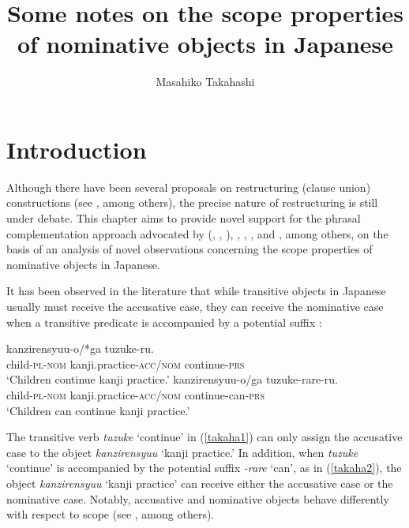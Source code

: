 \documentclass[output=paper]{langscibook}
\author{Masahiko Takahashi\affiliation{Yamagata University}\orcid{}}
\title{Some notes on the scope properties of nominative objects in Japanese}
\begin{document}
\maketitle

\section{Introduction}
Although there have been several proposals on restructuring (clause union) constructions (see \citealt{Miyagawa1987, SaitoHoshi1998, Cinque2006, wurmbrand2001, Wurmbrand2015a,Wurmbrand2015b, bobaljikwurmbrand2005, bobaljikwurmbrand2007, nomura2005, takahashi2011, shimamurawurmbrand2014}, among others), the precise nature of restructuring is still under debate. This chapter aims to provide novel support for the phrasal complementation approach advocated by \citeauthor{wurmbrand2001} (\citeyear{wurmbrand2001},
\citeyear{Wurmbrand2015a}, \citeyear{Wurmbrand2015b}), \citet{bobaljikwurmbrand2005, bobaljikwurmbrand2007}, \citet{nomura2005}, \citet{takahashi2011}, and \citet{shimamurawurmbrand2014}, among others, on the basis of an analysis of novel observations concerning the scope properties of nominative objects in Japanese.

It has been observed in the literature that while transitive objects in Japanese usually must receive the accusative case, they can receive the nominative case when a transitive predicate is accompanied by a potential suffix \citep{kuno1973}:

\ea \label{takaha1}
 {kanzirensyuu-o/*ga} {tuzuke-ru.}\\
	child-\textsc{pl}-\textsc{nom}       kanji.practice-\textsc{acc/nom} continue-\textsc{prs}\\
\glt `Children continue kanji practice.’
\ex \label{takaha2}
 {kanzirensyuu-o/ga} {tuzuke-rare-ru.}\\
	child-\textsc{pl}-\textsc{nom}       kanji.practice-\textsc{acc/nom} continue-can-\textsc{prs}\\
\glt `Children can continue kanji practice.’
\z

The transitive verb \emph{tuzuke} ‘continue’ in (\ref{takaha1}) can only assign the accusative case to the object \emph{kanzirensyuu} ‘kanji practice.’ In addition, when \emph{tuzuke} ‘continue’ is accompanied by the potential suffix \emph{-rare} ‘can’, as in (\ref{takaha2}), the object \emph{kanzirensyuu} ‘kanji practice’ can receive either the accusative case or the nominative case. Notably, accusative and nominative objects behave differently with respect to scope (see \citealt{Sano1985, Tada1992, Koizumi1998,Koizumi2008, Ura1999, Yatsushiro1999, Takano2003, nomura2005, bobaljikwurmbrand2007, takahashi2011, shimamurawurmbrand2014, FunakoshiTakahashi2014, ochisaruwatari2014a, kasai2018}, among others). 
\end{document}
